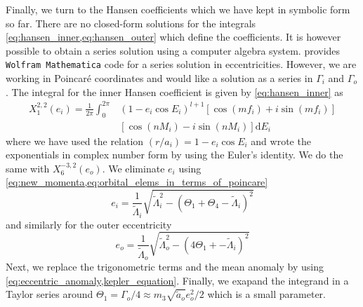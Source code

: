 Finally, we turn to the Hansen coefficients which we have kept in symbolic 
form so far. There are no closed-form solutions for the integrals 
\cref{eq:hansen_inner,eq:hansen_outer} which define the coefficients. It is however
possible to obtain a series solution using a computer algebra system. 
\Cite{Mardling2013} provides \texttt{Wolfram Mathematica} \citep{Mathematica} code 
for a series solution in eccentricities. However, we are working in Poincaré 
coordinates and would like a solution as a series in $\Gamma_i$ and $\Gamma_o$. 
The integral
for the inner Hansen coefficient is given by \cref{eq:hansen_inner} as
\begin{equation}
    \begin{aligned}
        X^{2,2}_1(e_i)= \frac{1}{2\pi} \int^{2\pi}_0 &(1-e_i\cos E_i)^{l+1}
        \left[\cos(mf_i)+i\sin(mf_i)\right]\\
        &\left[\cos(nM_i)-i\sin(nM_i)\right]\mathrm{d}E_i
    \end{aligned}
\end{equation}
where we have used the relation $(r/a_i)=1-e_i\cos E_i$ and wrote the 
exponentials in complex number form by using the Euler's identity. We 
do the same with $X^{-3,2}_6(e_o)$. We eliminate $e_i$ using 
\cref{eq:new_momenta,eq:orbital_elems_in_terms_of_poincare}
\begin{equation}
    e_i = \frac{1}{\tilde{\Lambda}_i} \sqrt{\tilde{\Lambda}_i^2-
    (\Theta_1+\Theta_4-\tilde{\Lambda}_i)^2}
\end{equation}
and similarly for the outer eccentricity
    \begin{equation}
        e_o = \frac{1}{\tilde{\Lambda}_o} \sqrt{\tilde{\Lambda}_o^2
        -(4\Theta_1+-\tilde{\Lambda}_i)^2}
\end{equation}
Next, we replace the trigonometric terms and the mean anomaly
by using \cref{eq:eccentric_anomaly,kepler_equation}. Finally,
we exapand the integrand in a Taylor series around $\Theta_1=
\Gamma_o/4\approx m_3\sqrt{\tilde{a}_o}e_o^2/2$ which is a
small parameter.



